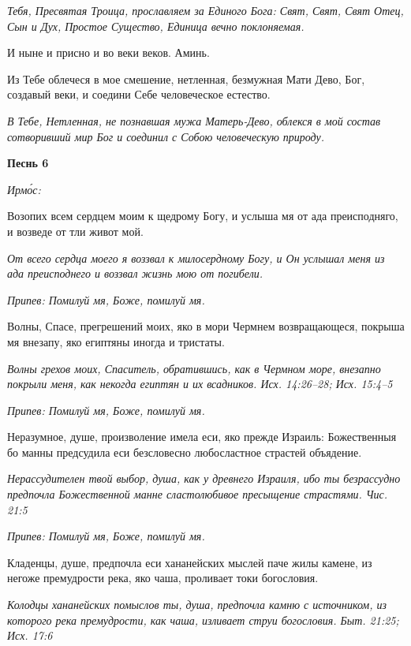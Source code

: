 \itshape Тебя, Пресвятая Троица, прославляем за Единого Бога: Свят, Свят, Свят Отец, Сын и Дух, Простое Существо, Единица вечно поклоняемая.\normalfont{}


И ныне и присно и во веки веков. Аминь.


Из Тебе облечеся в мое смешение, нетленная, безмужная Мати Дево, Бог, создавый веки, и соедини Себе человеческое естество.


\itshape В Тебе, Нетленная, не познавшая мужа Матерь-Дево, облекся в мой состав сотворивший мир Бог и соединил с Собою человеческую природу.\normalfont{}





\bfseries Песнь 6\normalfont{}


\itshape Ирмо́с:\normalfont{}


Возопих всем сердцем моим к щедрому Богу, и услыша мя от ада преисподняго, и возведе от тли живот мой.


\itshape От всего сердца моего я воззвал к милосердному Богу, и Он услышал меня из ада преисподнего и воззвал жизнь мою от погибели.\normalfont{}


\itshape Припев:\normalfont{} Помилуй мя, Боже, помилуй мя.


Волны, Спасе, прегрешений моих, яко в мори Чермнем возвращающеся, покрыша мя внезапу, яко египтяны иногда и тристаты.


\itshape Волны грехов моих, Спаситель, обратившись, как в Чермном море, внезапно покрыли меня, как некогда египтян и их всадников. Исх. 14:26–28; Исх. 15:4–5\normalfont{}


\itshape Припев:\normalfont{} Помилуй мя, Боже, помилуй мя.


Неразумное, душе, произволение имела еси, яко прежде Израиль: Божественныя бо манны предсудила еси безсловесно любосластное страстей объядение.


\itshape Нерассудителен твой выбор, душа, как у древнего Израиля, ибо ты безрассудно предпочла Божественной манне сластолюбивое пресыщение страстями. Чис. 21:5\normalfont{}


\itshape Припев:\normalfont{} Помилуй мя, Боже, помилуй мя.


Кладенцы, душе, предпочла еси хананейских мыслей паче жилы камене, из негоже премудрости река, яко чаша, проливает токи богословия.


\itshape Колодцы хананейских помыслов ты, душа, предпочла камню с источником, из которого река премудрости, как чаша, изливает струи богословия. Быт. 21:25; Исх. 17:6\normalfont{}


